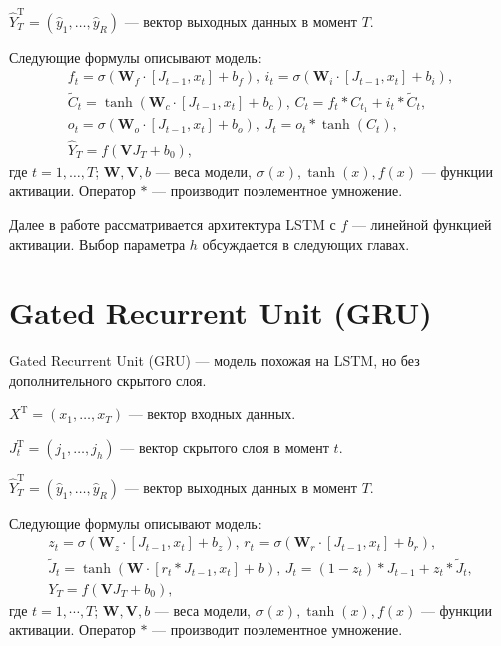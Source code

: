 \documentclass[specialist,
               substylefile = spbu.rtx,
               subf,href,colorlinks=true, 12p]{disser}
\begin{document}
$\widehat{Y}_T^\mathrm{T} = (\hat{y}_1, \ldots, \hat{y}_R)$ --- вектор выходных данных в момент $T$.

Следующие формулы описывают модель:
\begin{gather*}
	f_t = \sigma(\mathbf{W}_f \cdot [J_{t-1}, x_t] + b_f), \,
	i_t = \sigma(\mathbf{W}_i \cdot [J_{t-1}, x_t] + b_i), \\
	\widetilde{C}_t = \tanh(\mathbf{W}_c \cdot [J_{t-1}, x_t] + b_c), \,
	C_t = f_t * C_{t_1} + i_t * \widetilde{C}_t, \\
	o_t = \sigma(\mathbf{W}_o \cdot [J_{t-1}, x_t] + b_o), \,
	J_t = o_t * \tanh(C_t), \\
	\widehat{Y}_T = f(\mathbf{V} J_T + b_0),
\end{gather*}
где $t = 1, \ldots, T$; $\mathbf{W}, \mathbf{V}, b$ --- веса модели, $\sigma(x), \tanh(x), f(x)$ --- функции активации. Оператор $*$ --- производит поэлементное умножение.

Далее в работе рассматривается архитектура LSTM с $f$ --- линейной функцией активации. Выбор параметра $h$ обсуждается в следующих главах.

\section{Gated Recurrent Unit (GRU)}

Gated Recurrent Unit (GRU) --- модель похожая на LSTM, но без дополнительного скрытого слоя.

$X^\mathrm{T} = (x_1, \ldots, x_T)$ --- вектор входных данных.

$ J_t^\mathrm{T} = (j_1, \ldots, j_h)$ --- вектор скрытого слоя в момент $t$.

$\widehat{Y}_T^\mathrm{T} = (\hat{y}_1, \ldots, \hat{y}_R) $ --- вектор выходных данных в момент $T$.

Следующие формулы описывают модель:
\begin{gather*}
	z_t = \sigma(\mathbf{W}_z \cdot [J_{t-1}, x_t] + b_z), \,
	r_t = \sigma(\mathbf{W}_r \cdot [J_{t-1}, x_t] + b_r), \\
	\widetilde{J}_t = \tanh(\mathbf{W} \cdot [r_t * J_{t-1}, x_t] + b), \,
	J_t = (1 - z_t) * J_{t-1} + z_t * \widetilde{J}_t, \\
	Y_T = f(\mathbf{V} J_T + b_0),
\end{gather*}
где $t = 1, \cdots, T$;  $\mathbf{W}, \mathbf{V}, b$ --- веса модели, $\sigma(x), \tanh(x), f(x)$ --- функции активации. Оператор $*$ --- производит поэлементное умножение.
\end{document}
